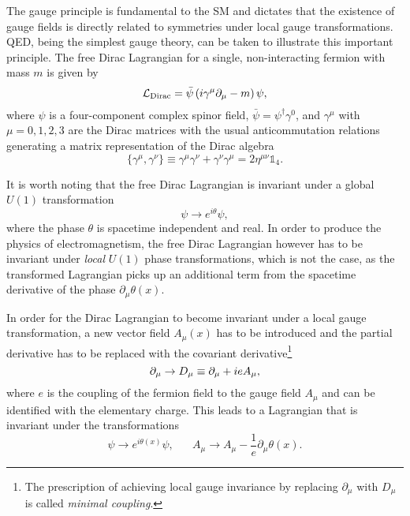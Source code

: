 The gauge principle is fundamental to the SM and dictates that the existence of gauge fields is directly related to symmetries under local gauge transformations. QED, being the simplest gauge theory, can be taken to illustrate this important principle. The free Dirac Lagrangian for a single, non-interacting fermion with mass $m$ is given by
\begin{equation}
	\mathcal{L}_\mathrm{Dirac}=\bar{\psi}\left(i\gamma^\mu\partial_\mu - m\right)\psi,
	\label{eq:dirac_lagrangian}
\end{equation}
where $\psi$ is a four-component complex spinor field, $\bar{\psi} = \psi^\dagger\gamma^0$, and $\gamma^\mu$ with $\mu = 0,1,2,3 $ are the Dirac matrices with the usual anticommutation relations generating a matrix representation of the Dirac algebra 
\begin{equation}
	\{\gamma^\mu,\gamma^\nu\} \equiv \gamma^\mu\gamma^\nu + \gamma^\nu\gamma^\mu = 2\eta^{\mu\nu}\mathbb{1}_4.
\end{equation}

It is worth noting that the free Dirac Lagrangian is invariant under a global $U(1)$ transformation
\begin{equation}
	\psi \rightarrow e^{i\theta}\psi,
\end{equation}
where the phase $\theta$ is spacetime independent and real. In order to produce the physics of electromagnetism, the free Dirac Lagrangian however has to be invariant under \textit{local} $U(1)$ phase transformations, which is not the case, as the transformed Lagrangian picks up an additional term from the spacetime derivative of the phase $\partial_\mu\theta(x)$.

In order for the Dirac Lagrangian to become invariant under a local gauge transformation, a new vector field $A_\mu(x)$ has to be introduced and the partial derivative has to be replaced with the covariant derivative\footnote{The prescription of achieving local gauge invariance by replacing $\partial_\mu$ with $D_\mu$ is called \textit{minimal coupling}.}
\begin{equation}
	\partial_\mu \rightarrow \mathop{}\!D_\mu \equiv \partial_\mu + ieA_\mu,
\end{equation}
where $e$ is the coupling of the fermion field to the gauge field $A_\mu$ and can be identified with the elementary charge. This leads to a Lagrangian that is invariant under the transformations
\begin{equation}
	\psi \rightarrow e^{i\theta\left(x\right)}\psi,\, \, \, \, \, \, \, \, \, \, A_\mu \rightarrow A_\mu - \frac{1}{e}\partial_\mu\theta(x).
	\label{eq:gauge_field}
\end{equation}


